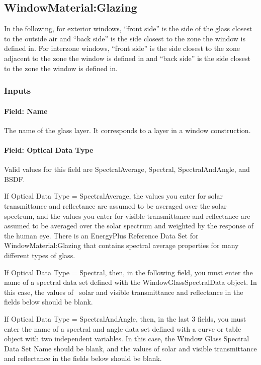 \subsection{WindowMaterial:Glazing}\label{windowmaterialglazing}

In the following, for exterior windows, ``front side'' is the side of the glass closest to the outside air and ``back side'' is the side closest to the zone the window is defined in. For interzone windows, ``front side'' is the side closest to the zone adjacent to the zone the window is defined in and ``back side'' is the side closest to the zone the window is defined in.

\subsubsection{Inputs}\label{inputs-13-015}

\paragraph{Field: Name}\label{field-name-7-020}

The name of the glass layer. It corresponds to a layer in a window construction.

\paragraph{Field: Optical Data Type}\label{field-optical-data-type}

Valid values for this field are SpectralAverage, Spectral, SpectralAndAngle, and BSDF.

If Optical Data Type = SpectralAverage, the values you enter for solar transmittance and reflectance are assumed to be averaged over the solar spectrum, and the values you enter for visible transmittance and reflectance are assumed to be averaged over the solar spectrum and weighted by the response of~ the human eye. There is an EnergyPlus Reference Data Set for WindowMaterial:Glazing that contains spectral average properties for many different types of glass.

If Optical Data Type = Spectral, then, in the following field, you must enter the name of a spectral data set defined with the WindowGlassSpectralData object. In this case, the values of~ solar and visible transmittance and reflectance in the fields below should be blank.

If Optical Data Type = SpectralAndAngle, then, in the last 3 fields, you must enter the name of a spectral and angle data set defined with a curve or table object with two independent variables. In this case, the Window Glass Spectral Data Set Name should be blank, and the values of solar and visible transmittance and reflectance in the fields below should be blank.


